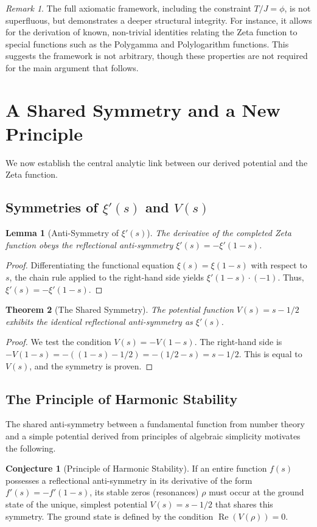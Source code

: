 \documentclass{amsart}
\theoremstyle{plain}
\newtheorem{theorem}{Theorem}[section]
\newtheorem{lemma}[theorem]{Lemma}
\theoremstyle{definition}
\newtheorem{conjecture}{Conjecture}
\theoremstyle{remark}
\newtheorem*{remark}{Remark}
\DeclareMathOperator{\re}{Re}
\begin{document}
\begin{remark}
The full axiomatic framework, including the constraint $T/J=\phi$, is not superfluous, but demonstrates a deeper structural integrity. For instance, it allows for the derivation of known, non-trivial identities relating the Zeta function to special functions such as the Polygamma and Polylogarithm functions. This suggests the framework is not arbitrary, though these properties are not required for the main argument that follows.
\end{remark}


\section{A Shared Symmetry and a New Principle}
We now establish the central analytic link between our derived potential and the Zeta function.

\subsection{Symmetries of \texorpdfstring{$\xi'(s)$ and $V(s)$}{xi'(s) and V(s)}}
\begin{lemma}[Anti-Symmetry of $\xi'(s)$]
\label{lem:xi_anti_symmetry}
The derivative of the completed Zeta function obeys the reflectional anti-symmetry $\xi'(s) = -\xi'(1-s)$.
\end{lemma}
\begin{proof}
Differentiating the functional equation $\xi(s) = \xi(1-s)$ with respect to $s$, the chain rule applied to the right-hand side yields $\xi'(1-s) \cdot (-1)$. Thus, $\xi'(s) = -\xi'(1-s)$.
\end{proof}

\begin{theorem}[The Shared Symmetry]
The potential function $V(s)=s-1/2$ exhibits the identical reflectional anti-symmetry as $\xi'(s)$.
\end{theorem}
\begin{proof}
We test the condition $V(s) = -V(1-s)$. The right-hand side is $-V(1-s) = -((1-s) - 1/2) = -(1/2 - s) = s - 1/2$. This is equal to $V(s)$, and the symmetry is proven.
\end{proof}

\subsection{The Principle of Harmonic Stability}
The shared anti-symmetry between a fundamental function from number theory and a simple potential derived from principles of algebraic simplicity motivates the following.
\begin{conjecture}[Principle of Harmonic Stability]
\label{conj:stability}
If an entire function $f(s)$ possesses a reflectional anti-symmetry in its derivative of the form $f'(s)=-f'(1-s)$, its stable zeros (resonances) $\rho$ must occur at the ground state of the unique, simplest potential $V(s)=s-1/2$ that shares this symmetry. The ground state is defined by the condition $\re(V(\rho))=0$.
\end{conjecture}
\end{document}
